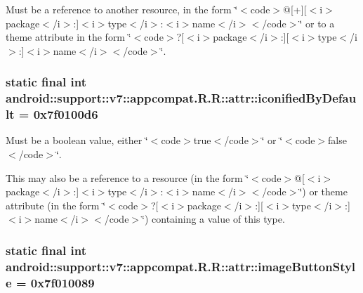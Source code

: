 Must be a reference to another resource, in the form \char`\"{}$<$code$>$@\mbox{[}+\mbox{]}\mbox{[}$<$i$>$package$<$/i$>$:\mbox{]}$<$i$>$type$<$/i$>$:$<$i$>$name$<$/i$>$$<$/code$>$\char`\"{} or to a theme attribute in the form \char`\"{}$<$code$>$?\mbox{[}$<$i$>$package$<$/i$>$:\mbox{]}\mbox{[}$<$i$>$type$<$/i$>$:\mbox{]}$<$i$>$name$<$/i$>$$<$/code$>$\char`\"{}. \hypertarget{classandroid_1_1support_1_1v7_1_1appcompat_1_1_r_1_1attr_4b2fd79dd4be3a982631c8e3c4f7b644}{
\subsubsection[{iconifiedByDefault}]{\setlength{\rightskip}{0pt plus 5cm}static final int android::support::v7::appcompat.R.R::attr::iconifiedByDefault = 0x7f0100d6}}
\label{classandroid_1_1support_1_1v7_1_1appcompat_1_1_r_1_1attr_4b2fd79dd4be3a982631c8e3c4f7b644}


Must be a boolean value, either \char`\"{}$<$code$>$true$<$/code$>$\char`\"{} or \char`\"{}$<$code$>$false$<$/code$>$\char`\"{}. 

This may also be a reference to a resource (in the form \char`\"{}$<$code$>$@\mbox{[}$<$i$>$package$<$/i$>$:\mbox{]}$<$i$>$type$<$/i$>$:$<$i$>$name$<$/i$>$$<$/code$>$\char`\"{}) or theme attribute (in the form \char`\"{}$<$code$>$?\mbox{[}$<$i$>$package$<$/i$>$:\mbox{]}\mbox{[}$<$i$>$type$<$/i$>$:\mbox{]}$<$i$>$name$<$/i$>$$<$/code$>$\char`\"{}) containing a value of this type. \hypertarget{classandroid_1_1support_1_1v7_1_1appcompat_1_1_r_1_1attr_32010412be5ceb25660873530a6b2606}{
\subsubsection[{imageButtonStyle}]{\setlength{\rightskip}{0pt plus 5cm}static final int android::support::v7::appcompat.R.R::attr::imageButtonStyle = 0x7f010089}}
\label{classandroid_1_1support_1_1v7_1_1appcompat_1_1_r_1_1attr_32010412be5ceb25660873530a6b2606}


